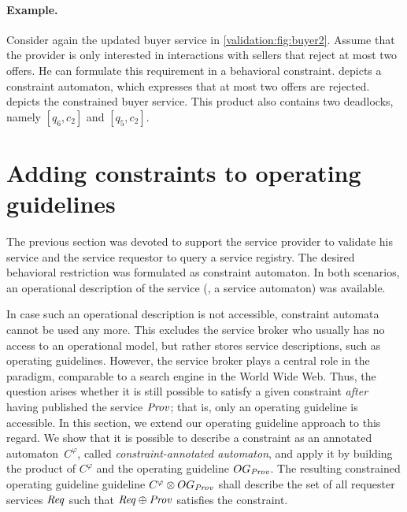 \medskip


\paragraph{Example.}

Consider again the updated buyer service in \autoref{validation:fig:buyer2}. Assume that the provider is only interested in interactions with sellers that reject at most two offers. He can formulate this requirement in a behavioral constraint.  depicts a constraint automaton, which expresses that at most two offers are rejected.  depicts the constrained buyer service. This product also contains two deadlocks, namely $[q_6,c_2]$ and $[q_5,c_2]$.





\section{Adding constraints to operating guidelines}\label{sect:validation_og}

The previous section was devoted to support the service provider to validate his service and the service requestor to query a service registry. The desired behavioral restriction was formulated as constraint automaton. In both scenarios, an operational description of the service (\ie, a service automaton) was available.

In case such an operational description is not accessible, constraint automata cannot be used any more. This excludes the service broker who usually has no access to an operational model, but rather stores service descriptions, such as operating guidelines. However, the service broker plays a central role in the  paradigm, comparable to a search engine in the World Wide Web. Thus, the question arises whether it is still possible to satisfy a given constraint \emph{after} having published the service $\mathit{Prov}$; that is, only an operating guideline is accessible. In this section, we extend our operating guideline approach to this regard. We show that it is possible to describe a constraint as an annotated automaton~$C^\varphi$, called \emph{constraint-annotated automaton}, and apply it by building the product of $C^\varphi$ and the operating guideline $\mathop{OG}_{\mathit{Prov}}$. The resulting constrained operating guideline guideline $C^\varphi \otimes \mathop{OG}_{\mathit{Prov}}$ shall describe the set of all requester services $\mathit{Req}$ such that $\mathit{Req} \oplus \mathit{Prov}$ satisfies the constraint.

